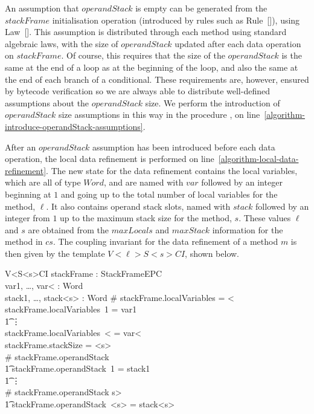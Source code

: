 An assumption that $operandStack$ is empty can be generated from the
$stackFrame$ initialisation operation (introduced by rules such as
Rule~[]), using
Law~[].
This assumption is distributed through each method using standard
algebraic laws, with the size of $operandStack$ updated after each
data operation on $stackFrame$.
Of course, this requires that the size of the $operandStack$ is the
same at the end of a loop as at the beginning of the loop, and also
the same at the end of each branch of a conditional.
These requirements are, however, ensured by bytecode verification so
we are always able to distribute well-defined assumptions about the
$operandStack$ size.
We perform the introduction of $operandStack$ size assumptions in this
way in the procedure
, on
line~\ref{algorithm-introduce-operandStack-assumptions}.

After an $operandStack$ assumption has been introduced before each
data operation, the local data refinement is performed on
line~\ref{algorithm-local-data-refinement}.
The new state for the data refinement contains the local variables,
which are all of type $Word$, and are named with $var$ followed by an
integer beginning at $1$ and going up to the total number of local
variables for the method, $\ell$.
It also contains operand stack slots, named with $stack$ followed by
an integer from $1$ up to the maximum stack size for the method, $s$.
These values $\ell$ and $s$ are obtained from the $maxLocals$ and
$maxStack$ information for the  method in $cs$.
The coupling invariant for the data refinement of a method
$m$ is then given by the template $V{<}\ell{>}S{<}s{>}CI$, shown below.

\begin{schema}{V{<}\ell{>}S{<}s{>}CI}
  stackFrame : StackFrameEPC \\
  var1, \ldots, var{<}\ell{>} : Word \\
  stack1, \ldots, stack{<}s{>} : Word
\where
  \# stackFrame.localVariables = {<}\ell{>} \\
  stackFrame.localVariables~1 = var1 \\
  \t1 \vdots \\
  stackFrame.localVariables~{<}\ell{>} = var{<}\ell{>} \\
  stackFrame.stackSize = {<}s{>} \\
  \# stackFrame.operandStack  \implies \\
  \t1 stackFrame.operandStack~1 = stack1 \\
  \t1 \vdots \\
  \# stackFrame.operandStack \geq {<}s{>} \implies \\
  \t1 stackFrame.operandStack~{<}s{>} = stack{<}s{>}
\end{schema}

